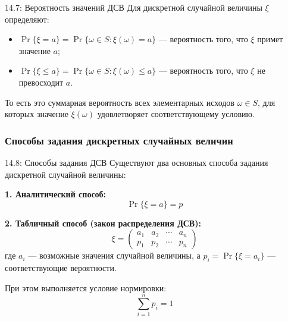 \documentclass[a4paper,12pt]{article}
\begin{document}
	\begin{definitionbox}{14.7: Вероятность значений ДСВ}
		Для дискретной случайной величины \(\xi\) определяют:
		\begin{itemize}
			\item \(\Pr\{\xi = a\} = \Pr\{\omega \in S : \xi(\omega) = a\}\) — вероятность того, что \(\xi\) примет значение \(a\);
			\item \(\Pr\{\xi \leq a\} = \Pr\{\omega \in S : \xi(\omega) \leq a\}\) — вероятность того, что \(\xi\) не превосходит \(a\).
		\end{itemize}
		
		То есть это суммарная вероятность всех элементарных исходов \(\omega \in S\), для которых значение \(\xi(\omega)\) удовлетворяет соответствующему условию.
	\end{definitionbox}
	
	\subsubsection{Способы задания дискретных случайных величин}
	
	\begin{definitionbox}{14.8: Способы задания ДСВ}
		Существуют два основных способа задания дискретной случайной величины:
		
		\textbf{1. Аналитический способ:}
		\[ \Pr\{\xi = a\} = p \]
		
		\textbf{2. Табличный способ (закон распределения ДСВ):}
		\[ \xi = \begin{pmatrix}
			a_1 & a_2 & \cdots & a_n \\
			p_1 & p_2 & \cdots & p_n
		\end{pmatrix} \]
		где \(a_i\) — возможные значения случайной величины, а \(p_i = \Pr\{\xi = a_i\}\) — соответствующие вероятности.
		
		При этом выполняется условие нормировки:
		\[ \sum_{i=1}^n p_i = 1 \]
	\end{definitionbox}
	
\end{document}
